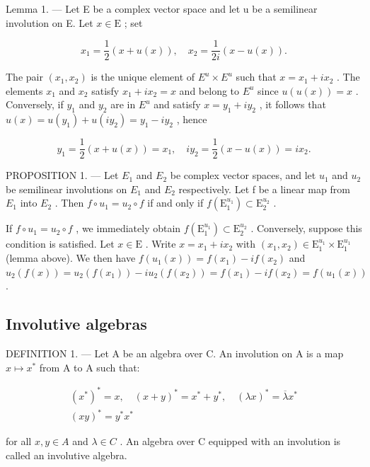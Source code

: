 Lemma 1. --- Let E be a complex vector space and let u be a semilinear involution on E. Let \(x \in \mathrm{E}\) ; set

\[
x _ {1} = \frac {1}{2} (x + u (x)), \quad x _ {2} = \frac {1}{2 i} (x - u (x)).
\]

The pair \((x_{1}, x_{2})\) is the unique element of \(E^{u} \times E^{u}\) such that \(x = x_{1} + ix_{2}\) . The elements \(x_{1}\) and \(x_{2}\) satisfy \(x_{1} + ix_{2} = x\) and belong to \(E^{u}\) since \(u(u(x)) = x\) . Conversely, if \(y_{1}\) and \(y_{2}\) are in \(E^{u}\) and satisfy \(x = y_{1} + iy_{2}\) , it follows that \(u(x) = u(y_{1}) + u(iy_{2}) = y_{1} - iy_{2}\) , hence

\[
y _ {1} = \frac {1}{2} (x + u (x)) = x _ {1}, \quad i y _ {2} = \frac {1}{2} (x - u (x)) = i x _ {2}.
\]

PROPOSITION 1. --- Let \(E_{1}\) and \(E_{2}\) be complex vector spaces, and let \(u_{1}\) and \(u_{2}\) be semilinear involutions on \(E_{1}\) and \(E_{2}\) respectively. Let f be a linear map from \(E_{1}\) into \(E_{2}\) . Then \(f \circ u_{1} = u_{2} \circ f\) if and only if \(f(\mathrm{E}_{1}^{u_{1}}) \subset \mathrm{E}_{2}^{u_{2}}\) .

If \(f \circ u_1 = u_2 \circ f\) , we immediately obtain \(f(\mathrm{E}_1^{u_1}) \subset \mathrm{E}_2^{u_2}\) . Conversely, suppose this condition is satisfied. Let \(x \in \mathrm{E}\) . Write \(x = x_1 + ix_2\) with \((x_1, x_2) \in \mathrm{E}_1^{u_1} \times \mathrm{E}_1^{u_1}\) (lemma above). We then have \(f(u_1(x)) = f(x_1) - if(x_2)\) and \(u_2(f(x)) = u_2(f(x_1)) - iu_2(f(x_2)) = f(x_1) - if(x_2) = f(u_1(x))\) .

\subsection{Involutive algebras}

DEFINITION 1. --- Let A be an algebra over C. An involution on A is a map \(x \mapsto x^{*}\) from A to A such that:

\[
\begin{array}{c} (x ^ {*}) ^ {*} = x, \quad (x + y) ^ {*} = x ^ {*} + y ^ {*}, \quad (\lambda x) ^ {*} = \overline {{\lambda}} x ^ {*} \\ (x y) ^ {*} = y ^ {*} x ^ {*} \end{array}
\]

for all \(x, y \in A\) and \(\lambda \in C\) . An algebra over C equipped with an involution is called an involutive algebra.

